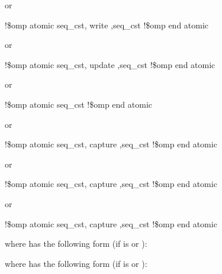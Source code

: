 or

\begin{boxedcode}
!\$omp atomic \plc{[}seq\_cst\plc{[},\plc{]]} write \plc{[[},\plc{]}seq\_cst\plc{]}
\plc{[}!\$omp end atomic\plc{]}
\end{boxedcode}

or

\begin{boxedcode}
!\$omp atomic \plc{[}seq\_cst\plc{[},\plc{]]} update \plc{[[},\plc{]}seq\_cst\plc{]}
\plc{[}!\$omp end atomic\plc{]}
\end{boxedcode}

or

\begin{boxedcode}
!\$omp atomic \plc{[}seq\_cst\plc{]} 
\plc{[}!\$omp end atomic\plc{]}
\end{boxedcode}

or

\begin{boxedcode}
!\$omp atomic \plc{[}seq\_cst\plc{[},\plc{]]} capture \plc{[[},\plc{]}seq\_cst\plc{]}
!\$omp end atomic
\end{boxedcode}

or

\begin{boxedcode}
!\$omp atomic \plc{[}seq\_cst\plc{[},\plc{]]} capture \plc{[[},\plc{]}seq\_cst\plc{]}
!\$omp end atomic
\end{boxedcode}

or

\begin{boxedcode}
!\$omp atomic \plc{[}seq\_cst\plc{[},\plc{]]} capture \plc{[[},\plc{]}seq\_cst\plc{]}
!\$omp end atomic
\end{boxedcode}

where  has the following form (if  
is  or ):

\begin{quote}
\end{quote}

where  has the following form (if  
is  or ):

\begin{quote}
\end{quote}

